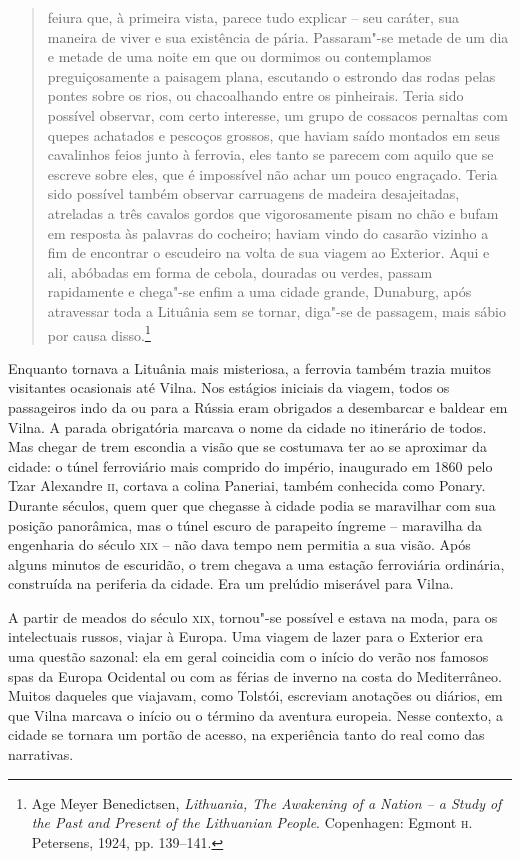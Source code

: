 \begin{quote}
feiura que, à primeira vista, parece tudo explicar -- seu caráter, sua
maneira de viver e sua existência de pária. Passaram"-se metade de um dia
e metade de uma noite em que ou dormimos ou contemplamos preguiçosamente
a paisagem plana, escutando o estrondo das rodas pelas pontes sobre os
rios, ou chacoalhando entre os pinheirais. Teria sido possível observar,
com certo interesse, um grupo de cossacos pernaltas com quepes achatados
e pescoços grossos, que haviam saído montados em seus cavalinhos feios
junto à ferrovia, eles tanto se parecem com aquilo que se escreve sobre
eles, que é impossível não achar um pouco engraçado. Teria sido possível
também observar carruagens de madeira desajeitadas, atreladas a três
cavalos gordos que vigorosamente pisam no chão e bufam em resposta às
palavras do cocheiro; haviam vindo do casarão vizinho a fim de encontrar
o escudeiro na volta de sua viagem ao Exterior. Aqui e ali, abóbadas em
forma de cebola, douradas ou verdes, passam rapidamente e chega"-se enfim
a uma cidade grande, Dunaburg, após atravessar toda a Lituânia sem se
tornar, diga"-se de passagem, mais sábio por causa disso.\footnote{Age Meyer Benedictsen, \textit{Lithuania, The Awakening of a Nation -- a Study of the Past and Present of the Lithuanian People}. Copenhagen: Egmont \textsc{h}.\,Petersens, 1924, pp. 139--141.} 
\end{quote}

Enquanto tornava a Lituânia mais misteriosa, a ferrovia também trazia
muitos visitantes ocasionais até Vilna. Nos estágios iniciais da viagem,
todos os passageiros indo da ou para a Rússia eram obrigados a
desembarcar e baldear em Vilna. A parada obrigatória marcava o nome da
cidade no itinerário de todos. Mas chegar de trem escondia a visão que
se costumava ter ao se aproximar da cidade: o túnel ferroviário mais
comprido do império, inaugurado em 1860 pelo Tzar Alexandre \textsc{ii}, cortava
a colina Paneriai, também conhecida como Ponary. Durante séculos, quem quer que chegasse à
cidade podia se maravilhar com sua posição panorâmica, mas o túnel
escuro de parapeito íngreme -- maravilha da engenharia do século \textsc{xix} -- não
dava tempo nem permitia a sua visão. Após alguns minutos de escuridão, o
trem chegava a uma estação ferroviária ordinária, construída na
periferia da cidade. Era um prelúdio miserável para Vilna.

A partir de meados do século \textsc{xix}, tornou"-se possível e estava na moda,
para os intelectuais russos, viajar à Europa. Uma viagem de lazer para o
Exterior era uma questão sazonal: ela em geral coincidia com o início do
verão nos famosos spas da Europa Ocidental ou com as férias de inverno
na costa do Mediterrâneo. Muitos daqueles que viajavam, como Tolstói,
escreviam anotações ou diários, em que Vilna marcava o início ou o
término da aventura europeia. Nesse contexto, a cidade se tornara um
portão de acesso, na experiência tanto do real como das narrativas.

